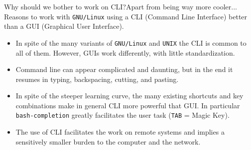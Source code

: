 \begin{frame}{Why should we bother to work on CLI?}{Apart from being way more cooler...}
   { Reasons to work with \texttt{GNU/Linux} using a \alert{CLI} (Command Line Interface) better than a GUI (Graphical User Interface).}
   \begin{itemize}
   \item {\small In spite of the many variants of  \texttt{GNU/Linux} and  \texttt{UNIX} the CLI is \alert{common to all of them}. However,  GUIs work differently, with little standardization.}
     
   \item {\small  Command line can appear complicated and daunting, but in the end it resumes in typing, backspacing, cutting, and pasting.}
     
   \item {\small   In spite of the steeper learning curve, the many existing shortcuts and key combinations make in general CLI more powerful that GUI. In particular \texttt{bash-completion} greatly facilitates the user task (\texttt{TAB} = Magic Key).}

   \item {\small  The use of CLI facilitates the work on remote systems and implies a sensitively smaller burden to the computer and the network.
     }
  \end{itemize}
\end{frame}
